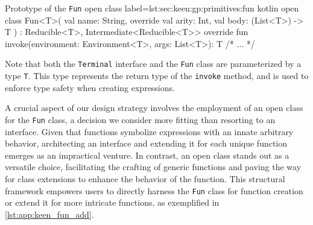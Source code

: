   \begin{code}{Prototype of the \texttt{Fun} open class}{
    label=lst:sec:keen:gp:primitives:fun
  }{kotlin}
    open class Fun<T>(
        val name: String, override val arity: Int, val body: (List<T>) -> T
    ) : Reducible<T>, Intermediate<Reducible<T>> {
        override fun invoke(environment: Environment<T>, args: List<T>): T { /* ... */ }
    }
  \end{code}

  Note that both the \texttt{Terminal} interface and the \texttt{Fun} class
  are parameterized by a type \texttt{T}. This type represents the return
  type of the \texttt{invoke} method, and is used to enforce type safety
  when creating expressions.

  A crucial aspect of our design strategy involves the employment of an open 
  class for the \texttt{Fun} class, a decision we consider more fitting than 
  resorting to an interface. Given that functions symbolize expressions with 
  an innate arbitrary behavior, architecting an interface and extending it 
  for each unique function emerges as an impractical venture. In contrast, an 
  open class stands out as a versatile choice, facilitating the crafting of 
  generic functions and paving the way for class extensions to enhance the 
  behavior of the function. This structural framework empowers users to 
  directly harness the \texttt{Fun} class for function creation or extend it 
  for more intricate functions, as exemplified in \vref{lst:app:keen_fun_add}.
  